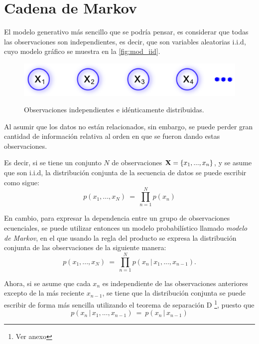 \section{Cadena de Markov}

El modelo generativo más sencillo que se podría pensar, es considerar que todas las observaciones son independientes, es decir, que son variables aleatorias i.i.d, cuyo modelo gráfico se muestra en la \autoref{fig:mod_iid}.

\begin{figure}[bt]
        \myfloatalign
        {\includegraphics[width=0.6\linewidth]{gfx/chap2/mod-iid}}        
        \caption{Observaciones independientes e idénticamente distribuidas.}
        \label{fig:mod_iid}
\end{figure}

Al asumir que los datos no están relacionados, sin embargo, se puede perder gran cantidad de información relativa al orden en que se fueron dando estas observaciones.

Es decir, si se tiene un conjunto $N$ de observaciones $\textbf{X} = \lbrace x_1, ..., x_n \rbrace$, y se asume que son i.i.d, la distribución conjunta de la secuencia de datos se puede escribir como sigue:
\begin{equation}
\label{eqn:2-1}
p(x_1, ..., x_N) ~=~ \prod_{n=1}^N p(x_n)
\end{equation}

En cambio, para expresar la dependencia entre un grupo de observaciones ecuenciales, se puede utilizar entonces un modelo probabilístico llamado \textit{modelo de Markov}, en el que usando la regla del producto  se expresa la distribución conjunta de las observaciones de la siguiente manera:
\begin{equation}
\label{eqn:2-2}
p(x_1, ..., x_N) ~=~ \prod_{n=1}^N p(x_n \,|\, x_1, ..., x_{n-1}).
\end{equation}

Ahora, si se asume que cada $x_n$ es independiente de las observaciones anteriores excepto de la más reciente $x_{n-1}$, se tiene que la distribución conjunta se puede escribir de forma más sencilla utilizando el teorema de separación D \footnote{Ver anexo}, puesto que 
\begin{equation}
\label{eqn:2-3}
p(x_n \,|\, x_1, ..., x_{n-1}) ~=~ p(x_n \,|\, x_{n-1})
\end{equation}

